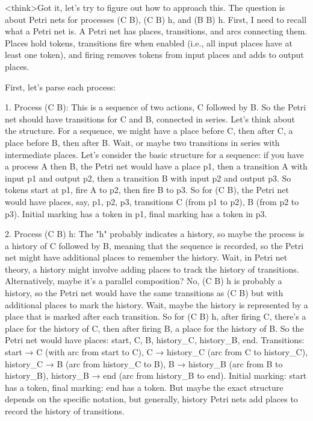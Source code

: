 <think>Got it, let's try to figure out how to approach this. The question is about Petri nets for processes (C B), (C B) h, and (B B) h. First, I need to recall what a Petri net is. A Petri net has places, transitions, and arcs connecting them. Places hold tokens, transitions fire when enabled (i.e., all input places have at least one token), and firing removes tokens from input places and adds to output places.

First, let's parse each process:

1. Process (C B): This is a sequence of two actions, C followed by B. So the Petri net should have transitions for C and B, connected in series. Let's think about the structure. For a sequence, we might have a place before C, then after C, a place before B, then after B. Wait, or maybe two transitions in series with intermediate places. Let's consider the basic structure for a sequence: if you have a process A then B, the Petri net would have a place p1, then a transition A with input p1 and output p2, then a transition B with input p2 and output p3. So tokens start at p1, fire A to p2, then fire B to p3. So for (C B), the Petri net would have places, say, p1, p2, p3, transitions C (from p1 to p2), B (from p2 to p3). Initial marking has a token in p1, final marking has a token in p3.

2. Process (C B) h: The "h" probably indicates a history, so maybe the process is a history of C followed by B, meaning that the sequence is recorded, so the Petri net might have additional places to remember the history. Wait, in Petri net theory, a history might involve adding places to track the history of transitions. Alternatively, maybe it's a parallel composition? No, (C B) h is probably a history, so the Petri net would have the same transitions as (C B) but with additional places to mark the history. Wait, maybe the history is represented by a place that is marked after each transition. So for (C B) h, after firing C, there's a place for the history of C, then after firing B, a place for the history of B. So the Petri net would have places: start, C, B, history_C, history_B, end. Transitions: start → C (with arc from start to C), C → history_C (arc from C to history_C), history_C → B (arc from history_C to B), B → history_B (arc from B to history_B), history_B → end (arc from history_B to end). Initial marking: start has a token, final marking: end has a token. But maybe the exact structure depends on the specific notation, but generally, history Petri nets add places to record the history of transitions.

